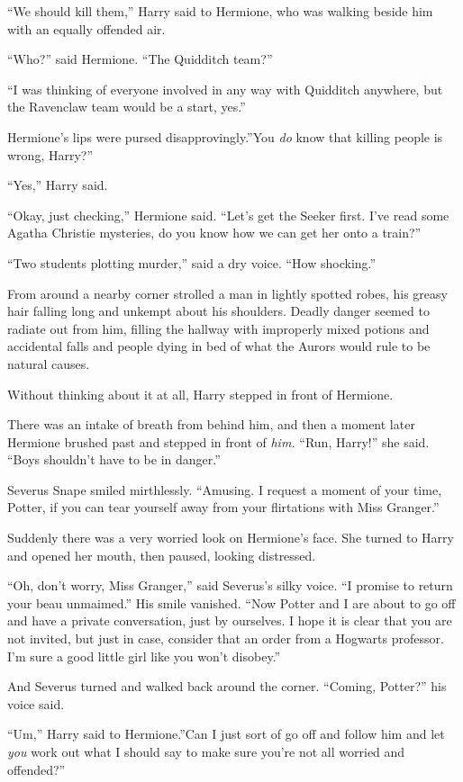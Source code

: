 ``We should kill them,'' Harry said to Hermione, who was walking beside
him with an equally offended air.

``Who?'' said Hermione. ``The Quidditch team?''

``I was thinking of everyone involved in any way with Quidditch
anywhere, but the Ravenclaw team would be a start, yes.''

Hermione's lips were pursed disapprovingly.''You \emph{do} know that
killing people is wrong, Harry?''

``Yes,'' Harry said.

``Okay, just checking,'' Hermione said. ``Let's get the Seeker first.
I've read some Agatha Christie mysteries, do you know how we can get her
onto a train?''

``Two students plotting murder,'' said a dry voice. ``How shocking.''

From around a nearby corner strolled a man in lightly spotted robes, his
greasy hair falling long and unkempt about his shoulders. Deadly danger
seemed to radiate out from him, filling the hallway with improperly
mixed potions and accidental falls and people dying in bed of what the
Aurors would rule to be natural causes.

Without thinking about it at all, Harry stepped in front of Hermione.

There was an intake of breath from behind him, and then a moment later
Hermione brushed past and stepped in front of \emph{him.} ``Run,
Harry!'' she said. ``Boys shouldn't have to be in danger.''

Severus Snape smiled mirthlessly. ``Amusing. I request a moment of your
time, Potter, if you can tear yourself away from your flirtations with
Miss Granger.''

Suddenly there was a very worried look on Hermione's face. She turned to
Harry and opened her mouth, then paused, looking distressed.

``Oh, don't worry, Miss Granger,'' said Severus's silky voice. ``I
promise to return your beau unmaimed.'' His smile vanished. ``Now Potter
and I are about to go off and have a private conversation, just by
ourselves. I hope it is clear that you are not invited, but just in
case, consider that an order from a Hogwarts professor. I'm sure a good
little girl like you won't disobey.''

And Severus turned and walked back around the corner. ``Coming,
Potter?'' his voice said.

``Um,'' Harry said to Hermione.''Can I just sort of go off and follow
him and let \emph{you} work out what I should say to make sure you're
not all worried and offended?''

